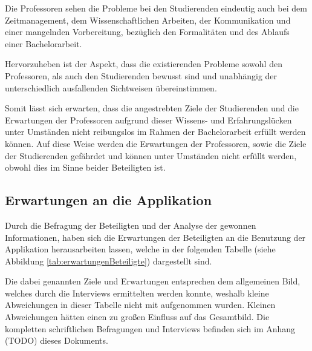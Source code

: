 \documentclass{scrreprt}
\begin{document}
\par Die Professoren sehen die Probleme bei den Studierenden eindeutig auch bei dem Zeitmanagement, dem Wissenschaftlichen Arbeiten, der Kommunikation und einer mangelnden Vorbereitung, bezüglich den Formalitäten und des Ablaufs einer Bachelorarbeit.\\

\par Hervorzuheben ist der Aspekt, dass die existierenden Probleme sowohl den Professoren, als auch den Studierenden bewusst sind und unabhängig der unterschiedlich ausfallenden Sichtweisen übereinstimmen.\\

\par Somit lässt sich erwarten, dass die angestrebten Ziele der Studierenden und die Erwartungen der Professoren aufgrund dieser Wissens- und Erfahrungslücken unter Umständen nicht reibungslos im Rahmen der Bachelorarbeit erfüllt werden können. Auf diese Weise werden die Erwartungen der Professoren, sowie die Ziele der Studierenden gefährdet und können unter Umständen nicht erfüllt werden, obwohl dies im Sinne beider Beteiligten ist.

\subsection{Erwartungen an die Applikation}
\par Durch die Befragung der Beteiligten und der Analyse der gewonnen Informationen, haben sich die Erwartungen der Beteiligten an die Benutzung der Applikation herausarbeiten lassen, welche in der folgenden Tabelle (siehe Abbildung \ref{tab:erwartungenBeteiligte}) dargestellt sind.
\par Die dabei genannten Ziele und Erwartungen entsprechen dem allgemeinen Bild, welches durch die Interviews ermittelten werden konnte, weshalb kleine Abweichungen in dieser Tabelle nicht mit aufgenommen wurden. Kleinen Abweichungen hätten einen zu großen Einfluss auf das Gesamtbild. Die kompletten schriftlichen Befragungen und Interviews befinden sich im Anhang (TODO) dieses Dokuments.\\
\end{document}
